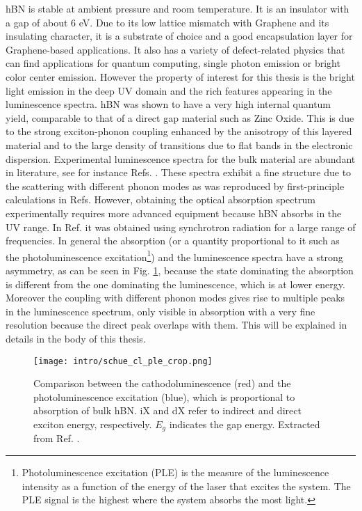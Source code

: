 hBN is stable at ambient pressure and room temperature. It is an insulator with a gap of about 6 eV. Due to its low lattice mismatch with Graphene and its insulating character, it is a substrate of choice and a good encapsulation layer for Graphene-based applications.\cite{kretinin2014electronic} It also has a variety of defect-related physics that can find applications for quantum computing,\cite{ivady2020ab} single photon emission\cite{grosso2017tunable} or bright color center emission.\cite{wigger2019phonon} However the property of interest for this thesis is the bright light emission in the deep UV domain and the rich features appearing in the luminescence spectra. hBN was shown to have a very high internal quantum yield, comparable to that of a direct gap material such as Zinc Oxide.\cite{schue2019bright} This is due to the strong exciton-phonon coupling enhanced by the anisotropy of this layered material and to the large density of transitions due to flat bands in the electronic dispersion.\cite{elias2021flat} Experimental luminescence spectra for the bulk material are abundant in literature, see for instance Refs. \cite{schue2019bright,cassabois2016hexagonal}. These spectra exhibit a fine structure due to the scattering with different phonon modes as was reproduced by first-principle calculations in Refs. \cite{cannuccia2019theory,paleari2019exciton}
However, obtaining the optical absorption spectrum experimentally requires more advanced equipment because \acrshort{hBN} absorbs in the \acrshort{UV} range. In Ref. \cite{artus2021ellipsometry} it was obtained using synchrotron radiation for a large range of frequencies. 
In general the absorption (or a quantity proportional to it such as the photoluminescence excitation\footnote{Photoluminescence excitation (PLE) is the measure of the luminescence intensity as a function of the energy of the laser that excites the system. The PLE signal is the highest where the system absorbs the most light.}) and the luminescence spectra have a strong asymmetry, as can be seen in Fig. \ref{fig:cl_ple}, because the state dominating the absorption is different from the one dominating the luminescence, which is at lower energy. Moreover the coupling with different phonon modes gives rise to multiple peaks in the luminescence spectrum, only visible in absorption with a very fine resolution because the direct peak overlaps with them. This will be explained in details in the body of this thesis.
\begin{figure}[h!b]
	\vspace{0.2cm}
	\setcapindent{2em}
	\centering
	\texttt{[image: intro/schue\_cl\_ple\_crop.png]}
	\caption{Comparison between the cathodoluminescence (red) and the photoluminescence excitation (blue), which is proportional to absorption of bulk hBN. iX and dX refer to indirect and direct exciton energy, respectively. $E_g$ indicates the gap energy.  Extracted from Ref. \cite{schue2019bright}.}
	\label{fig:cl_ple}
\end{figure}

